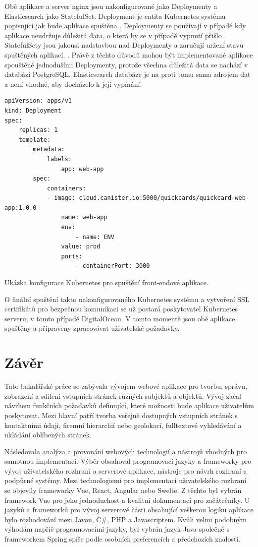 		Obě aplikace a server nginx jsou nakonfigurované jako Deploymenty a Elasticsearch jako StatefulSet.
		Deployment je entita Kubernetes systému popisující jak bude aplikace spuštěna \cite{deployements}.
		Deploymenty se používají v případě kdy aplikace neudržuje důležitá data, o která by se v případě vypnutí přišlo
		\cite{deployements}.
		StatefulSety jsou jakousi nadstavbou nad Deploymenty a zaručují uržení stavů spuštěných aplikací. \cite{statefulsets}.
		Právě z těchto důvodů mohou být implementované aplikace spouštěné jednodušími Deploymenty, protože všechna důležitá
		data se nachází v databázi PostgreSQL.
		Elasticsearch databáze je na proti tomu sama zdrojem dat a není vhodné, aby docházelo k její vypínání.

		\begin{lstlisting}
apiVersion: apps/v1
kind: Deployment
spec:
	replicas: 1
	template:
		metadata:
			labels:
				app: web-app
		spec:
			containers:
			- image: cloud.canister.io:5000/quickcards/quickcard-web-app:1.0.0
				name: web-app
				env:
					- name: ENV
				value: prod
				ports:
					- containerPort: 3000
		\end{lstlisting}
		Ukázka konfigurace Kubernetes pro spuštění front-endové aplikace. %

		O finální spuštění takto nakonfigurovaného Kubernetes systému a vytvoření SSL certifikátů pro bezpečnou komunikaci
		se už postará poskytovatel Kubernetes serveru; v tomto případě DigitalOcean.
		V tomto momentě jsou obě aplikace spuštěny a připraveny zpracovávat uživatelské požadavky.

\section{Závěr}

Tato bakalářské práce se zabývala vývojem webové aplikace pro tvorbu, správu, zobrazení a sdílení vstupních stránek
různých subjektů a objektů.
Vývoj začal návrhem funkčních požadavků definující, které možnosti bude aplikace uživatelům poskytovat.
Mezi hlavní patří tvorba veřejně dostupných vstupních stránek s kontaktními údaji, firemní hierarchií nebo geolokací,
fulltextové vyhledávání a ukládání oblíbených stránek.

Následovala analýza a provonání webových technologií a nástrojů vhodných pro samotnou implementaci.
Výběr obsahoval programovací jazyky a frameworky pro vývoj uživatelského rozhraní a serverové aplikace, nástroje pro návrh
rozhraní a podpůrné systémy.
Mezi technologiemi pro implementaci uživatelského rozhraní se objevily frameworky Vue, React, Angular nebo Swelte.
Z těchto byl vybrán framework Vue pro jeho jednoduchost a kvalitní dokumentaci pro začátečníky.
U jazyků a frameworků pro vývoj serverové části obsahující veškerou logiku aplikace bylo rozhodování mezi Javou,
C\#, PHP a Javascriptem.
Kvůli velmi podobným výhodám napříč programovacími jazyky, byl vybrán jazyk Java společně s frameworkem Spring spíše podle
osobních preferencích a předchozích znalostí.

